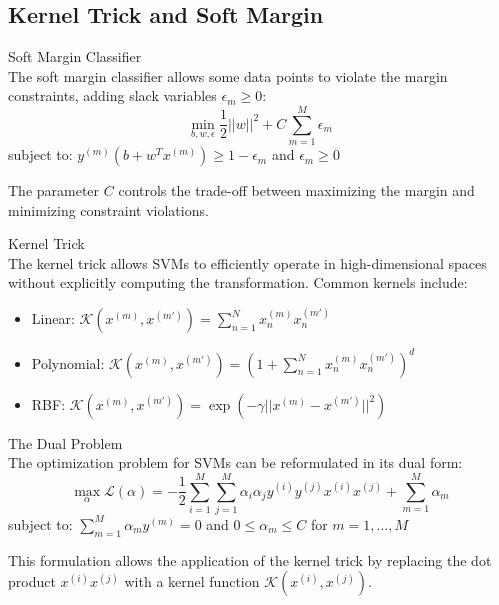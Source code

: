 \subsection{Kernel Trick and Soft Margin}

\begin{definition}{Soft Margin Classifier}\\
The soft margin classifier allows some data points to violate the margin constraints, adding slack variables $\epsilon_m \geq 0$:
\[\min_{b,w,\epsilon} \frac{1}{2}||w||^2 + C\sum_{m=1}^{M}\epsilon_m\]
subject to: $y^{(m)}(b + w^T x^{(m)}) \geq 1 - \epsilon_m$ and $\epsilon_m \geq 0$

The parameter $C$ controls the trade-off between maximizing the margin and minimizing constraint violations.
\end{definition}

\begin{definition}{Kernel Trick}\\
The kernel trick allows SVMs to efficiently operate in high-dimensional spaces without explicitly computing the transformation. Common kernels include:
\begin{itemize}
    \item Linear: $\mathcal{K}(x^{(m)}, x^{(m')}) = \sum_{n=1}^{N} x^{(m)}_n x^{(m')}_n$
    \item Polynomial: $\mathcal{K}(x^{(m)}, x^{(m')}) = (1 + \sum_{n=1}^{N} x^{(m)}_n x^{(m')}_n)^d$
    \item RBF: $\mathcal{K}(x^{(m)}, x^{(m')}) = \exp(-\gamma||x^{(m)} - x^{(m')}||^2)$
\end{itemize}
\end{definition}

\begin{concept}{The Dual Problem}\\
The optimization problem for SVMs can be reformulated in its dual form:
\[\max_{\alpha} \mathcal{L}(\alpha) = - \frac{1}{2}\sum_{i=1}^{M}\sum_{j=1}^{M}\alpha_i\alpha_j y^{(i)}y^{(j)}x^{(i)}x^{(j)} + \sum_{m=1}^{M}\alpha_m\]
subject to: $\sum_{m=1}^{M}\alpha_m y^{(m)} = 0$ and $0 \leq \alpha_m \leq C$ for $m = 1, ..., M$

This formulation allows the application of the kernel trick by replacing the dot product $x^{(i)}x^{(j)}$ with a kernel function $\mathcal{K}(x^{(i)}, x^{(j)})$.
\end{concept}

